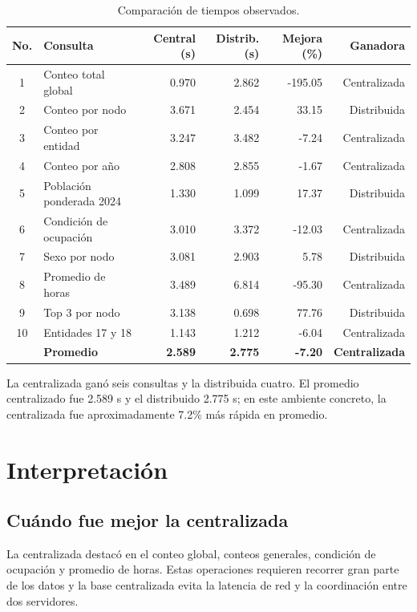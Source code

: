 \documentclass[12pt,letterpaper]{article}
\begin{document}
\begin{table}[H]
\centering
\small
\caption{Comparación de tiempos observados.}
\begin{tabular}{clrrrr}
\toprule
\textbf{No.} & \textbf{Consulta} & \textbf{Central (s)} &
\textbf{Distrib. (s)} & \textbf{Mejora (\%)} & \textbf{Ganadora}\\
\midrule
1 & Conteo total global & 0.970 & 2.862 & -195.05 & Centralizada\\
2 & Conteo por nodo & 3.671 & 2.454 & 33.15 & Distribuida\\
3 & Conteo por entidad & 3.247 & 3.482 & -7.24 & Centralizada\\
4 & Conteo por año & 2.808 & 2.855 & -1.67 & Centralizada\\
5 & Población ponderada 2024 & 1.330 & 1.099 & 17.37 & Distribuida\\
6 & Condición de ocupación & 3.010 & 3.372 & -12.03 & Centralizada\\
7 & Sexo por nodo & 3.081 & 2.903 & 5.78 & Distribuida\\
8 & Promedio de horas & 3.489 & 6.814 & -95.30 & Centralizada\\
9 & Top 3 por nodo & 3.138 & 0.698 & 77.76 & Distribuida\\
10 & Entidades 17 y 18 & 1.143 & 1.212 & -6.04 & Centralizada\\
\midrule
 & \textbf{Promedio} & \textbf{2.589} & \textbf{2.775} &
\textbf{-7.20} & \textbf{Centralizada}\\
\bottomrule
\end{tabular}
\end{table}

La centralizada ganó seis consultas y la distribuida cuatro. El promedio
centralizado fue 2.589 s y el distribuido 2.775 s; en este ambiente concreto,
la centralizada fue aproximadamente 7.2\% más rápida en promedio.

\section{Interpretación}

\subsection{Cuándo fue mejor la centralizada}

La centralizada destacó en el conteo global, conteos generales, condición de
ocupación y promedio de horas. Estas operaciones requieren recorrer gran parte
de los datos y la base centralizada evita la latencia de red y la coordinación
entre dos servidores.
\end{document}
